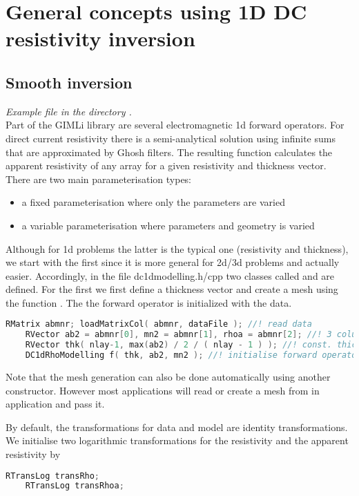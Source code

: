 \section{General concepts using 1D DC resistivity inversion}\label{sec:dc1d}
\subsection{Smooth inversion}\label{sec:dc1dsmooth}
{\em Example file  in the directory .}\\
Part of the GIMLi library are several electromagnetic 1d forward operators.
For direct current resistivity there is a semi-analytical solution using infinite sums that are approximated by Ghosh filters. 
The resulting function calculates the apparent resistivity of any array for a given resistivity and thickness vector.
There are two main parameterisation types:
\begin{itemize}
	\item a fixed parameterisation where only the parameters are varied 
	\item a variable parameterisation where parameters and geometry is varied
\end{itemize}

Although for 1d problems the latter is the typical one (resistivity and thickness), we start with the first since it is more general for 2d/3d problems and actually easier.
Accordingly, in the file dc1dmodelling.h/cpp two classes called  and  are defined.
For the first we first define a thickness vector and create a mesh using the function .
The the forward operator is initialized with the data.

\begin{lstlisting}[language=C++]
    RMatrix abmnr; loadMatrixCol( abmnr, dataFile ); //! read data
    RVector ab2 = abmnr[0], mn2 = abmnr[1], rhoa = abmnr[2]; //! 3 columns
    RVector thk( nlay-1, max(ab2) / 2 / ( nlay - 1 ) ); //! const. thickn.
    DC1dRhoModelling f( thk, ab2, mn2 ); //! initialise forward operator
\end{lstlisting}

Note that the mesh generation can also be done automatically using another constructor.
However most applications will read or create a mesh from in application and pass it.

By default, the transformations for data and model are identity transformations.
We initialise two logarithmic transformations for the resistivity and the apparent resistivity by 
\begin{lstlisting}[language=C++]
    RTransLog transRho;
    RTransLog transRhoa;
\end{lstlisting}

